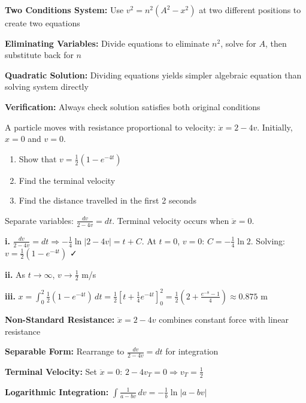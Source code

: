 \begin{takeaways}
\item \textbf{Two Conditions System:} Use $v^2 = n^2(A^2 - x^2)$ at two different positions to create two equations
\item \textbf{Eliminating Variables:} Divide equations to eliminate $n^2$, solve for $A$, then substitute back for $n$
\item \textbf{Quadratic Solution:} Dividing equations yields simpler algebraic equation than solving system directly
\item \textbf{Verification:} Always check solution satisfies both original conditions
\end{takeaways}

\begin{problem}
A particle moves with resistance proportional to velocity: $\ddot{x} = 2 - 4v$. Initially, $x = 0$ and $v = 0$.
\begin{enumerate}[label=\textbf{\roman*.}]
    \item Show that $v = \frac{1}{2}(1 - e^{-4t})$
    \item Find the terminal velocity
    \item Find the distance travelled in the first 2 seconds
\end{enumerate}
\end{problem}

\begin{hint}
Separate variables: $\frac{dv}{2-4v} = dt$. Terminal velocity occurs when $\ddot{x} = 0$.
\end{hint}

\begin{solution}
\textbf{i.} $\frac{dv}{2-4v} = dt \Rightarrow -\frac{1}{4}\ln|2-4v| = t + C$. At $t=0$, $v=0$: $C = -\frac{1}{4}\ln 2$. Solving: $v = \frac{1}{2}(1 - e^{-4t})$ ✓

\textbf{ii.} As $t \to \infty$, $v \to \frac{1}{2}$ m/s

\textbf{iii.} $x = \int_0^2 \frac{1}{2}(1-e^{-4t})\,dt = \frac{1}{2}[t + \frac{1}{4}e^{-4t}]_0^2 = \frac{1}{2}(2 + \frac{e^{-8} - 1}{4}) \approx 0.875$ m
\end{solution}

\begin{takeaways}
\item \textbf{Non-Standard Resistance:} $\ddot{x} = 2 - 4v$ combines constant force with linear resistance
\item \textbf{Separable Form:} Rearrange to $\frac{dv}{2-4v} = dt$ for integration
\item \textbf{Terminal Velocity:} Set $\ddot{x} = 0$: $2 - 4v_T = 0 \Rightarrow v_T = \frac{1}{2}$
\item \textbf{Logarithmic Integration:} $\int \frac{1}{a-bv}\,dv = -\frac{1}{b}\ln|a-bv|$
\end{takeaways}

